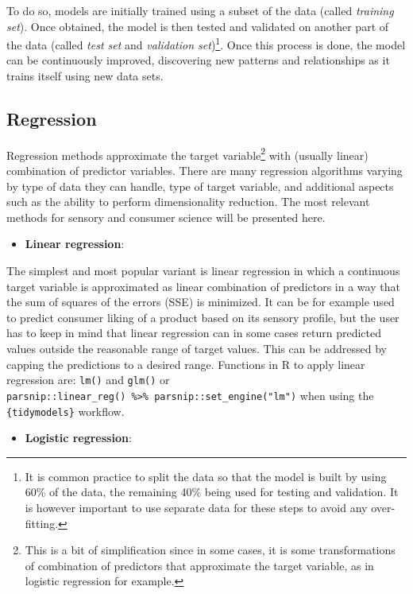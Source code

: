 \documentclass[
]{krantz}
\providecommand{\tightlist}{%
  \setlength{\itemsep}{0pt}\setlength{\parskip}{0pt}}
\begin{document}
To do so, models are initially trained using a subset of the data (called \emph{training set}). Once obtained, the model is then tested and validated on another part of the data (called \emph{test set} and \emph{validation set})\footnote{It is common practice to split the data so that the model is built by using 60\% of the data, the remaining 40\% being used for testing and validation. It is however important to use separate data for these steps to avoid any over-fitting.}. Once this process is done, the model can be continuously improved, discovering new patterns and relationships as it trains itself using new data sets.

\hypertarget{regression}{%
\subsection{Regression}\label{regression}}

Regression methods approximate the target variable\footnote{This is a bit of simplification since in some cases, it is some transformations of combination of predictors that approximate the target variable, as in logistic regression for example.} with (usually linear) combination of predictor variables. There are many regression algorithms varying by type of data they can handle, type of target variable, and additional aspects such as the ability to perform dimensionality reduction. The most relevant methods for sensory and consumer science will be presented here.

\begin{itemize}
\tightlist
\item
  \textbf{Linear regression}:
\end{itemize}

The simplest and most popular variant is linear regression in which a continuous target variable is approximated as linear combination of predictors in a way that the sum of squares of the errors (SSE) is minimized. It can be for example used to predict consumer liking of a product based on its sensory profile, but the user has to keep in mind that linear regression can in some cases return predicted values outside the reasonable range of target values. This can be addressed by capping the predictions to a desired range. Functions in R to apply linear regression are: \texttt{lm()} and \texttt{glm()} or \texttt{parsnip::linear\_reg()\ \%\textgreater{}\%\ parsnip::set\_engine("lm")} when using the \texttt{\{tidymodels\}} workflow.

\begin{itemize}
\tightlist
\item
  \textbf{Logistic regression}:
\end{itemize}
\end{document}
